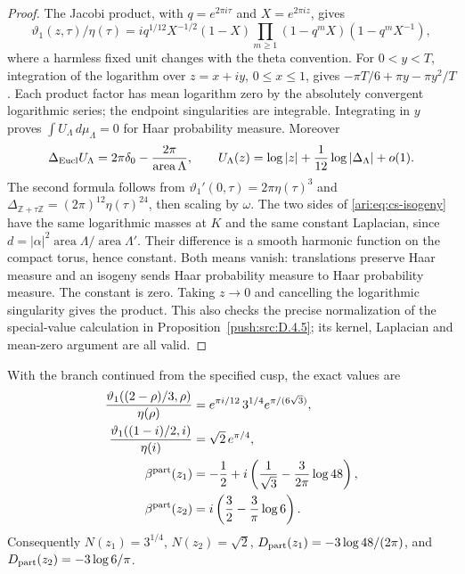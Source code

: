 \begin{proof}
The Jacobi product, with $q=e^{2\pi i\tau}$ and
$X=e^{2\pi iz}$, gives
\[
 \vartheta _1(z,\tau)/\eta(\tau)
 =i q^{1/12}X^{-1/2}(1-X)
     \prod_{m\ge1}(1-q^mX)(1-q^mX^{-1}),
\]
where a harmless fixed unit changes with the theta convention. For
$0<y<T$, integration of the logarithm over $z=x+iy$, $0\le x\le1$,
gives $-\pi T/6+\pi y-\pi y^2/T$. Each product factor has mean logarithm
zero by the absolutely convergent logarithmic series; the endpoint
singularities are integrable. Integrating in $y$ proves
$\int U_\Lambda\,d\mu_\Lambda=0$ for Haar probability measure.
Moreover
\[
 \Delta_{\rm Eucl}U_\Lambda
   =2\pi\delta_0-\frac{2\pi}{\operatorname{area}\Lambda},\qquad
 U_\Lambda(z)=\log|z|+\frac1{12}\log|\Delta_\Lambda|+o(1).
\]
The second formula follows from
$\vartheta _1'(0,\tau)=2\pi\eta(\tau)^3$ and
$\Delta_{\mathbb Z+\tau\mathbb Z}=(2\pi)^{12}\eta(\tau)^{24}$,
then scaling by $\omega$. The two sides of
\eqref{ari:eq:cs-isogeny} have the same logarithmic masses at $K$ and the
same constant Laplacian, since
$d=|\alpha|^2\operatorname{area}\Lambda/
\operatorname{area}\Lambda'$. Their difference is a smooth harmonic
function on the compact torus, hence constant. Both means vanish:
translations preserve Haar measure and an isogeny sends Haar
probability measure to Haar probability measure. The constant is zero.
Taking $z\to0$ and cancelling the logarithmic singularity gives the
product. This also checks the precise normalization of the special-value calculation in Proposition~\ref{push:src:D.4.5};
its kernel, Laplacian and mean-zero argument are all valid.
\end{proof}
\begin{proposition}\label{ari:C.1.2}
With the branch continued from the specified cusp, the exact values are
\begin{align*}
 \frac{\vartheta _1((2-\rho)/3,\rho)}{\eta(\rho)}
   &=e^{\pi i/12}\,3^{1/4}e^{\pi/(6\sqrt3)},\\
 \frac{\vartheta _1((1-i)/2,i)}{\eta(i)}
   &=\sqrt2\,e^{\pi/4},\\
 \beta^{\rm part}(z_1)
   &=-\frac12+i\left(\frac1{\sqrt3}-\frac3{2\pi}\log48\right),\\
 \beta^{\rm part}(z_2)
   &=i\left(\frac32-\frac3\pi\log6\right).
\end{align*}
Consequently $N(z_1)=3^{1/4}$, $N(z_2)=\sqrt2$,
$D_{\rm part}(z_1)=-3\log48/(2\pi)$, and
$D_{\rm part}(z_2)=-3\log6/\pi$.
\end{proposition}

